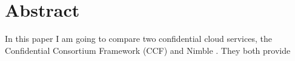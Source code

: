 \section*{Abstract}	
	In this paper I am going to compare two confidential cloud services, the Confidential Consortium Framework (CCF) \cite{Howard} and Nimble \cite{Nimble}. They both provide \\